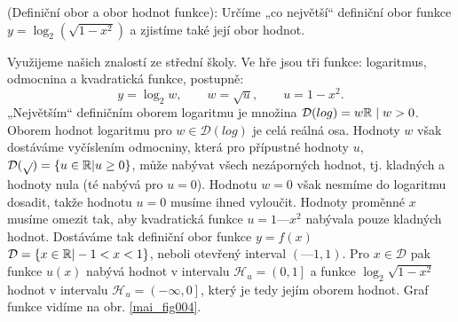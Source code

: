 \wikitextrule
\begin{example}\label{fyz:fey_exam017}
  (Definiční obor a obor hodnot funkce): Určíme „co největší“ definiční obor funkce 
  \(y=\log_2{(\sqrt{1-x^2})}\) a zjistíme také její obor hodnot.
      
  {\centering
   \captionsetup{type=figure}
   
  \par}
  
  Využijeme našich znalostí ze střední školy. Ve hře jsou tři funkce: logaritmus, odmocnina a 
  kvadratická funkce, postupně: 
  \begin{equation*}
    y = \log_2w, \qquad w = \sqrt{u}, \qquad u = 1 - x^2.
  \end{equation*}
  „Největším“ definičním oborem logaritmu je množina \(\mathcal{D}(log) = {w\mathbb{R} \mid w > 0}\).
  Oborem hodnot logaritmu pro \(w \in \mathcal{D}(log)\) je celá reálná osa. Hodnoty \(w\) však 
  dostáváme vyčíslením odmocniny, která pro přípustné hodnoty \(u\), \(\mathcal{D}(\sqrt{ }) = 
  \lbrace u\in\mathbb{R} | u\geq 0\rbrace\), může nabývat všech nezáporných hodnot, tj. kladných a 
  hodnoty nula (té nabývá pro \(u = 0\)). Hodnotu \(w = 0\) však nesmíme do logaritmu dosadit, 
  takže hodnotu \(u = 0\) musíme ihned vyloučit. Hodnoty proměnné \(x\) musíme omezit tak, aby 
  kvadratická funkce \(u = 1 — x^2\) nabývala pouze kladných hodnot. Dostáváme tak definiční obor 
  funkce \(y = f(x)\) \(\mathcal{D}=\lbrace x\in\mathbb{R} | -1<x<1\rbrace\), neboli otevřený 
  interval \((—1, 1)\). Pro \(x \in \mathcal{D}\) pak funkce \(u(x)\) nabývá hodnot v          
  intervalu \(\mathcal{H}_u = \left( 0, 1\right]\) a funkce \(\log_2\sqrt{1-x^2}\) hodnot v 
  intervalu \(\mathcal{H}_u = \left( -\infty, 0\right]\), který je tedy jejím oborem hodnot. Graf 
  funkce vidíme na obr. \ref{mai_fig004}. 
\end{example}